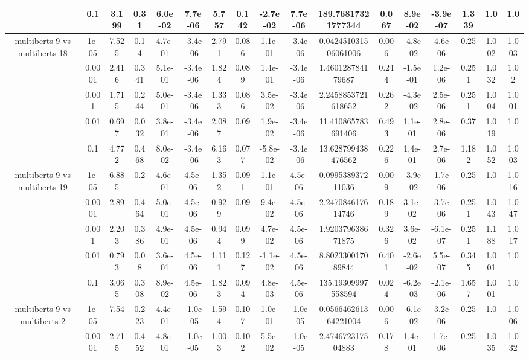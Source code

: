 \begin{tabular}{|c|c|c|c|c|c|c|c|c|c|c|c|c|c|c|c|c|}
 & 0.1 & 3.199 & 0.31 & 6.0e-02 & 7.7e-06 & 5.757 & 0.142 & -2.7e-02 & 7.7e-06 & 189.76817321777344 & 0.067 & 8.9e-02 & -3.9e-07 & 1.339 & 1.0 & 1.0 \\
\hline
\multirow{5}{*}{multiberts 9 vs multiberts 18} & 1e-05 & 7.525 & 0.14 & 4.7e-01 & -3.4e-06 & 2.791 & 0.086 & 1.1e-01 & -3.4e-06 & 0.042451031506061006 & 0.006 & -4.8e-02 & -4.6e-06 & 0.25 & 1.002 & 1.003 \\
 & 0.0001 & 2.416 & 0.341 & 5.1e-01 & -3.4e-06 & 1.824 & 0.089 & 1.4e-01 & -3.4e-06 & 1.460128784179687 & 0.244 & -1.5e-01 & 1.2e-06 & 0.251 & 1.032 & 1.02 \\
 & 0.001 & 1.715 & 0.244 & 5.0e-01 & -3.4e-06 & 1.333 & 0.086 & 3.5e-02 & -3.4e-06 & 2.2458853721618652 & 0.262 & -4.3e-02 & 2.5e-06 & 0.251 & 1.004 & 1.001 \\
 & 0.01 & 0.697 & 0.032 & 3.8e-01 & -3.4e-06 & 2.087 & 0.09 & 1.9e-02 & -3.4e-06 & 11.410865783691406 & 0.493 & 1.1e-01 & 2.8e-06 & 0.37 & 1.019 & 1.0 \\
 & 0.1 & 4.772 & 0.468 & 8.0e-02 & -3.4e-06 & 6.163 & 0.077 & -5.8e-02 & -3.4e-06 & 13.628799438476562 & 0.226 & 1.4e-01 & 2.7e-06 & 1.182 & 1.052 & 1.003 \\
\hline
\multirow{5}{*}{multiberts 9 vs multiberts 19} & 1e-05 & 6.885 & 0.2 & 4.6e-01 & 4.5e-06 & 1.352 & 0.091 & 1.1e-01 & 4.5e-06 & 0.099538937211036 & 0.009 & -3.9e-02 & -1.7e-06 & 0.25 & 1.0 & 1.016 \\
 & 0.0001 & 2.89 & 0.464 & 5.0e-01 & 4.5e-06 & 0.929 & 0.09 & 9.4e-02 & 4.5e-06 & 2.247084617614746 & 0.189 & 3.1e-02 & -3.7e-06 & 0.251 & 1.043 & 1.047 \\
 & 0.001 & 2.203 & 0.386 & 4.9e-01 & 4.5e-06 & 0.944 & 0.099 & 4.7e-02 & 4.5e-06 & 1.920379638671875 & 0.326 & 3.6e-02 & -6.1e-07 & 0.251 & 1.188 & 1.017 \\
 & 0.01 & 0.793 & 0.08 & 3.6e-01 & 4.5e-06 & 1.111 & 0.127 & -1.1e-02 & 4.5e-06 & 8.802330017089844 & 0.401 & -2.6e-02 & 5.5e-07 & 0.345 & 1.001 & 1.0 \\
 & 0.1 & 3.065 & 0.308 & 8.9e-02 & 4.5e-06 & 1.823 & 0.094 & 4.8e-03 & 4.5e-06 & 135.19309997558594 & 0.024 & -6.2e-03 & -2.1e-06 & 1.657 & 1.001 & 1.0 \\
\hline
\multirow{5}{*}{multiberts 9 vs multiberts 2} & 1e-05 & 7.54 & 0.223 & 4.4e-01 & -1.0e-05 & 1.594 & 0.107 & 1.0e-01 & -1.0e-05 & 0.056646261364221004 & 0.006 & -6.1e-02 & -3.2e-06 & 0.25 & 1.0 & 1.006 \\
 & 0.0001 & 2.715 & 0.452 & 4.8e-01 & -1.0e-05 & 1.003 & 0.102 & 5.5e-02 & -1.0e-05 & 2.474672317504883 & 0.178 & 1.4e-01 & 1.7e-06 & 0.25 & 1.035 & 1.032 \\

\end{tabular}
